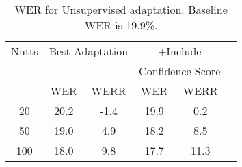 \begin{table}
\begin{center}
\begin{small}
\caption{WER for Unsupervised adaptation. Baseline WER is 19.9\%.} \label{tab:mean-FA-diff}
\begin{tabular}{|c|c|c|c|c|c|}
\hline
Nutts &  \multicolumn{2}{|c|}{Best Adaptation} & \multicolumn{2}{|c|}{+Include} \\
&  \multicolumn{2}{|c|}{ }  & \multicolumn{2}{|c|}{Confidence-Score} \\
\hline
 &   WER & WERR & WER & WERR\\
\hline
20 &  20.2  & -1.4  & 19.9 & 0.2\\
50 &  19.0  & 4.9  & 18.2 & 8.5\\
100 &  18.0  & 9.8  & 17.7 & 11.3\\
\hline
\end{tabular}
\end{small}
\end{center}
\end{table}
